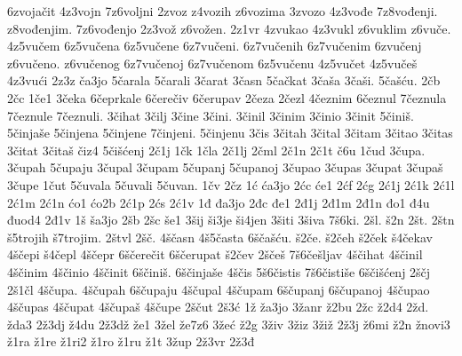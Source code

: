 {6zvojačit
4z3vojn
7z6voljni
2zvoz
z4vozih
z6vozima
3zvozo
4z3vođe
7z8vođenji.
z8vođenjim.
7z6vođenjo
2z3vož
z6vožen.
2z1vr
4zvukao
4z3vukl
z6vuklim
z6vuče.
4z5vučem
6z5vučena
6z5vučene
6z7vučeni.
6z7vučenih
6z7vučenim
6zvučenj
z6vučeno.
z6vučenog
6z7vučenoj
6z7vučenom
6z5vučenu
4z5vučet
4z5vučeš
4z3vući
2z3z
ča3jo
5čarala
5čarali
3čarat
3časn
5čačkat
3čaša
3čaši.
5čašću.
2čb
2čc
1če1
3čeka
6čeprkale
6čerečiv
6čerupav
2čeza
2čezl
4čeznim
6čeznul
7čeznula
7čeznule
7čeznuli.
3čihat
3čilj
3čine
3čini.
3činil
3činim
3činio
3činit
5činiš.
5činjaše
5činjena
5činjene
7činjeni.
5činjenu
3čis
3čitah
3čital
3čitam
3čitao
3čitas
3čitat
3čitaš
čiz4
5čišćenj
2č1j
1čk
1čla
2č1lj
2čml
2č1n
2č1t
č6u
1čud
3čupa.
3čupah
5čupaju
3čupal
3čupam
5čupanj
5čupanoj
3čupao
3čupas
3čupat
3čupaš
3čupe
1čut
5čuvala
5čuvali
5čuvan.
1čv
2čz
1ć
ća3jo
2ćc
će1
2ćf
2ćg
2ć1j
2ć1k
2ć1l
2ć1m
2ć1n
ćo1
ćo2b
2ć1p
2ćs
2ć1v
1đ
đa3jo
2đc
đe1
2đ1j
2đ1m
2đ1n
đo1
đ4u
đuod4
2đ1v
1š
ša3jo
2šb
2šc
še1
3šij
ši3je
ši4jen
3šiti
3šiva
7š6ki.
2šl.
š2n
2št.
2štn
š5trojih
š7trojim.
2štvl
2šč.
4ščasn
4š5časta
6ščašću.
š2če.
š2čeh
š2ček
š4čekav
4ščepi
š4čepl
4ščepr
6ščerečit
6ščerupat
š2čev
2ščeš
7š6češljav
4ščihat
4ščinil
4ščinim
4ščinio
4ščinit
6ščiniš.
6ščinjaše
4ščis
5š6čistis
7š6čistiše
6ščišćenj
2ščj
2š1čl
4ščupa.
4ščupah
6ščupaju
4ščupal
4ščupam
6ščupanj
6ščupanoj
4ščupao
4ščupas
4ščupat
4ščupaš
4ščupe
2ščut
2š3ć
1ž
ža3jo
3žanr
ž2bu
2žc
ž2d4
2žd.
žda3
2ž3dj
ž4du
2ž3dž
že1
3žel
že7z6
3žeć
ž2g
3živ
3žiz
3žiž
2ž3j
ž6mi
ž2n
žnovi3
ž1ra
ž1re
ž1ri2
ž1ro
ž1ru
ž1t
3žup
2ž3vr
2ž3đ
}
